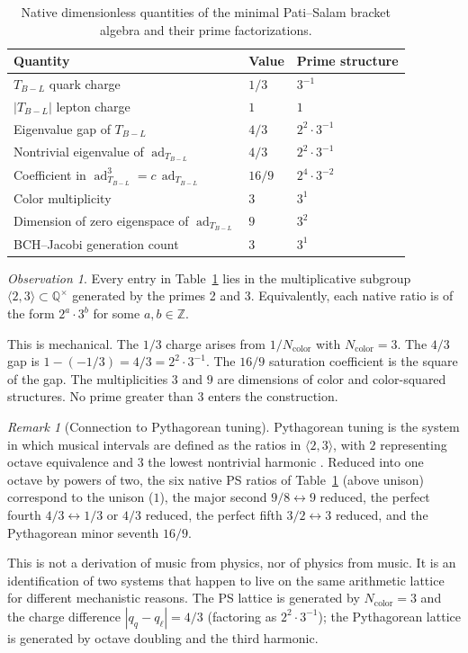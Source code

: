 \documentclass[11pt]{article}
\theoremstyle{plain}
\theoremstyle{remark}
\newtheorem*{remark}{Remark}
\newtheorem*{observation}{Observation}
\newcommand{\TBL}{T_{B\!-\!L}}
\newcommand{\ad}{\operatorname{ad}}
\begin{document}
\begin{table}[h]
\centering
\small
\begin{tabular}{lll}
\toprule
Quantity & Value & Prime structure \\
\midrule
$\TBL$ quark charge & $1/3$ & $3^{-1}$ \\
$|\TBL|$ lepton charge & $1$ & $1$ \\
Eigenvalue gap of $\TBL$ & $4/3$ & $2^2 \cdot 3^{-1}$ \\
Nontrivial eigenvalue of $\ad_{\TBL}$ & $4/3$ & $2^2 \cdot 3^{-1}$ \\
Coefficient in $\ad_{\TBL}^3 = c \, \ad_{\TBL}$ & $16/9$ & $2^4 \cdot 3^{-2}$ \\
Color multiplicity & $3$ & $3^1$ \\
Dimension of zero eigenspace of $\ad_{\TBL}$ & $9$ & $3^2$ \\
BCH--Jacobi generation count & $3$ & $3^1$ \\
\bottomrule
\end{tabular}
\caption{Native dimensionless quantities of the minimal Pati--Salam
bracket algebra and their prime factorizations.}
\label{tab:ps-ratios}
\end{table}

\begin{observation}
\label{obs:lattice}
Every entry in Table~\ref{tab:ps-ratios} lies in the multiplicative
subgroup $\langle 2, 3 \rangle \subset \mathbb{Q}^\times$ generated
by the primes 2 and 3.  Equivalently, each native ratio is of the
form $2^a \cdot 3^b$ for some $a, b \in \mathbb{Z}$.
\end{observation}

This is mechanical.  The $1/3$ charge arises from $1/N_{\mathrm{color}}$
with $N_{\mathrm{color}} = 3$.  The $4/3$ gap is $1 - (-1/3) = 4/3 =
2^2 \cdot 3^{-1}$.  The $16/9$ saturation coefficient is the square
of the gap.  The multiplicities $3$ and $9$ are dimensions of color
and color-squared structures.  No prime greater than $3$ enters the
construction.

\begin{remark}[Connection to Pythagorean tuning]
Pythagorean tuning is the system in which musical intervals are
defined as the ratios in $\langle 2, 3 \rangle$, with $2$ representing
octave equivalence and $3$ the lowest nontrivial harmonic
\cite{Barker1989}.  Reduced into one octave by powers of two, the
six native PS ratios of Table~\ref{tab:ps-ratios} (above unison)
correspond to the unison ($1$), the major second
$9/8 \leftrightarrow 9$ reduced, the perfect fourth
$4/3 \leftrightarrow 1/3$ or $4/3$ reduced, the perfect fifth
$3/2 \leftrightarrow 3$ reduced, and the Pythagorean minor seventh
$16/9$.

This is not a derivation of music from physics, nor of physics from
music.  It is an identification of two systems that happen to live
on the same arithmetic lattice for different mechanistic reasons.
The PS lattice is generated by $N_{\mathrm{color}} = 3$ and the
charge difference $|q_q - q_\ell| = 4/3$ (factoring as
$2^2 \cdot 3^{-1}$); the Pythagorean lattice is generated by octave
doubling and the third harmonic.
\end{remark}
\end{document}
